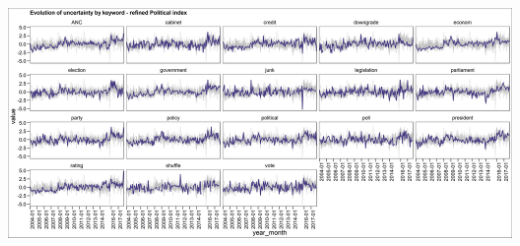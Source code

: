 \documentclass[11pt,preprint, authoryear]{elsarticle}
\let\origfigure\figure
\let\endorigfigure\endfigure
\renewenvironment{figure}[1][2] {
    \expandafter\origfigure\expandafter[H]
} {
    \endorigfigure
}
\numberwithin{equation}{section}
\numberwithin{figure}{section}
\numberwithin{table}{section}
\begin{document}
\begin{figure}
	\centering
	\includegraphics[width=\linewidth, keepaspectratio]{bin/pol_key_refine}\\
	\caption{Composite Political uncertainty refined index. \label{fig_pol_key_r}}
\end{figure}
\end{document}
